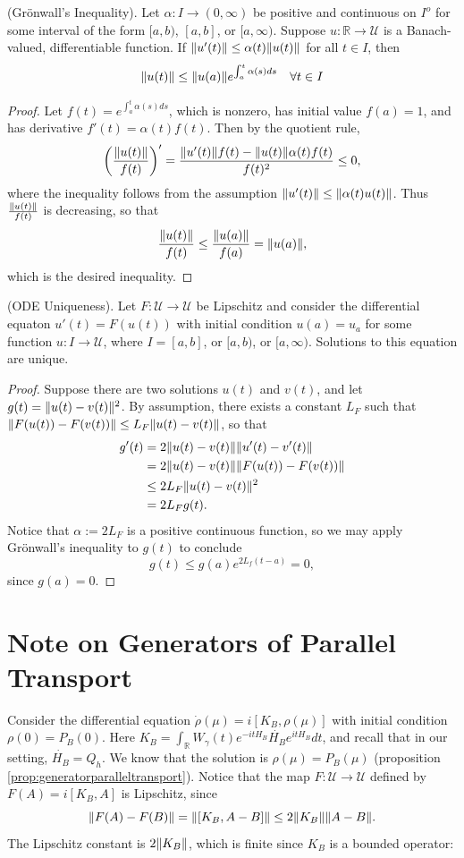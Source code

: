\documentclass[12pt, letterpaper]{article}
\begin{document}
\begin{theorem}
(Gr\"{o}nwall's Inequality). Let $\alpha : I \to (0,\infty)$ be positive and continuous on $I^o$ for some interval of the form $[a,b)$, $[a,b]$, or $[a,\infty)$. Suppose $u : \mathbb{R} \to \mathcal{U}$ is a Banach-valued, differentiable function. If $\lVert u'(t) \rVert \leq \alpha(t)\lVert u(t) \rVert$ for all $t\in I$, then 
\[\lVert u(t) \rVert \leq \lVert u(a) \rVert e^{\int_a^t \alpha(s)ds} \quad \forall t\in I\]
\end{theorem}
\label{thm:gronwallinequality}
\begin{proof}
Let $f(t) = e^{\int_a^t \alpha(s)ds}$, which is nonzero, has initial value $f(a)=1$, and has derivative $f'(t) = \alpha(t) f(t)$. Then by the quotient rule,
\[\left(\frac{\lVert u(t) \rVert}{f(t)}\right)' = \frac{\lVert u'(t) \rVert f(t) - \lVert u(t) \rVert\alpha(t)f(t)}{f(t)^2} \leq 0,\]
where the inequality follows from the assumption $\lVert u'(t) \rVert \leq \lVert \alpha(t)u(t) \rVert$. Thus $\frac{\lVert u(t) \rVert}{f(t)}$ is decreasing, so that 
\[\frac{\lVert u(t) \rVert}{f(t)} \leq \frac{\lVert u(a) \rVert}{f(a)} = \lVert u(a) \rVert,\]
which is the desired inequality.
\end{proof}

\begin{theorem}
(ODE Uniqueness). Let $F:\mathcal{U}\to\mathcal{U}$ be Lipschitz and consider the differential equaton $u'(t)=F(u(t))$ with initial condition $u(a) = u_a$ for some function $u:I\to\mathcal{U}$, where $I = [a,b]$, or $[a,b)$, or $[a,\infty)$. Solutions to this equation are unique.
\end{theorem}
\label{thm:gronwalluniqueness}
\begin{proof}
Suppose there are two solutions $u(t)$ and $v(t)$, and let $g(t) = \lVert u(t)-v(t) \rVert^2$. By assumption, there exists a constant $L_F$ such that $\lVert F(u(t))-F(v(t)) \rVert \leq L_F \lVert u(t)-v(t) \rVert$, so that
\[\begin{aligned}
g'(t) &= 2\lVert u(t)-v(t) \rVert\lVert u'(t)-v'(t) \rVert\\
&=2\lVert u(t)-v(t) \rVert\lVert F(u(t))-F(v(t)) \rVert\\
&\leq 2L_F\lVert u(t)-v(t) \rVert^2\\
&= 2L_F g(t).
\end{aligned}\]
Notice that $\alpha := 2L_F$ is a positive continuous function, so we may apply Gr\"{o}nwall's inequality to $g(t)$ to conclude
\[g(t) \leq g(a)e^{2L_f(t-a)} = 0,\]
since $g(a)=0$.
\end{proof}

\section{Note on Generators of Parallel Transport}
Consider the differential equation $\dot{\rho}(\mu) = i[K_B,\rho(\mu)]$ with initial condition $\rho(0)=P_B(0)$. Here $K_B = \int_\mathbb{R}W_\gamma(t)e^{-itH_B}\dot{H_B}e^{itH_B}dt$, and recall that in our setting, $\dot{H_B} = Q_h$. We know that the solution is $\rho(\mu) = P_B(\mu)$ (proposition \ref{prop:generatorparalleltransport}). Notice that the map $F:\mathcal{U}\to\mathcal{U}$ defined by $F(A) = i[K_B,A]$ is Lipschitz, since
\[\lVert F(A)-F(B) \rVert = \lVert [K_B,A-B] \rVert \leq 2\lVert K_B \rVert\lVert A-B \rVert.\]
The Lipschitz constant is $2\lVert K_B \rVert$, which is finite since $K_B$ is a bounded operator:
\end{document}
